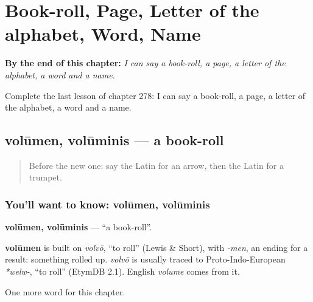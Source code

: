 
\chapter{Book-roll, Page, Letter of the alphabet, Word, Name}
\label{ch:la-book-roll-page-letter-of-the-alphabet-word-name}

\begin{chapteropening}
\textbf{By the end of this chapter:} \emph{I can say a book-roll, a page, a letter of the alphabet, a word and a name.}

Complete the last lesson of chapter 278: I can say a book-roll, a page, a letter of the alphabet, a word and a name.
\end{chapteropening}

\section[volūmen, volūminis]{volūmen, volūminis — a book-roll}

\label{lesson:LA-C278-volumen}



\begin{quote}
Before the new one: say the Latin for an arrow, then the Latin for a trumpet.
\end{quote}

\subsection*{You'll want to know: volūmen, volūminis}
\textbf{volūmen, volūminis} — \textquotedblleft{}a book-roll\textquotedblright{}.

\begin{cousinweb}
\textbf{volūmen} is built on \emph{volvō}, \textquotedblleft{}to roll\textquotedblright{} (Lewis \& Short), with \emph{-men}, an ending for a result: something rolled up. \emph{volvō} is usually traced to Proto-Indo-European \emph{*welw-}, \textquotedblleft{}to roll\textquotedblright{} (EtymDB 2.1). English \emph{volume} comes from it.
\end{cousinweb}

\begin{grammarlens}[title={What you've built}]
One more word for this chapter.
\end{grammarlens}

